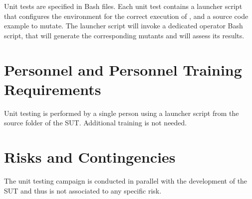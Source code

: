 Unit tests are specified in Bash files. Each unit test contains a launcher script that configures the environment for the correct execution of \FAQAS, and a source code example to mutate. The launcher script will invoke a dedicated operator Bash script, that will generate the corresponding mutants and will assess its results.


\section{Personnel and Personnel Training Requirements}

Unit testing is performed by a single person using a launcher script from the source folder of the SUT. Additional training is not needed.

\section{Risks and Contingencies}

The unit testing campaign is conducted in parallel with the development of the SUT and thus is not associated to any specific risk.
